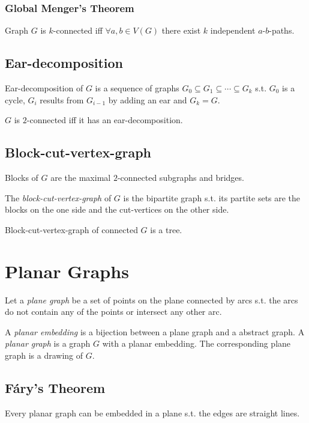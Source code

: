 \subsubsection*{Global Menger's Theorem}

Graph $G$ is $k$-connected iff $\forall a,b \in V(G)$ there exist $k$ independent $a$-$b$-paths.

\subsection*{Ear-decomposition}

Ear-decomposition of $G$ is a sequence of graphs $G_0 \subseteq G_1 \subseteq \cdots \subseteq G_k$ s.t. $G_0$ is a cycle, $G_i$ results from $G_{i-1}$ by adding an ear and $G_k = G$.

\spacing

$G$ is $2$-connected iff it has an ear-decomposition.

\subsection*{Block-cut-vertex-graph}

Blocks of $G$ are the maximal $2$-connected subgraphs and bridges.

The \emph{block-cut-vertex-graph} of $G$ is the bipartite graph s.t. its partite sets are the blocks on the one side and the cut-vertices on the other side.

\spacing

Block-cut-vertex-graph of connected $G$ is a tree.

\section*{Planar Graphs}

Let a \emph{plane graph} be a set of points on the plane connected by arcs s.t. the arcs do not contain any of the points or intersect any other arc.

A \emph{planar embedding} is a bijection between a plane graph and a abstract graph.
A \emph{planar graph} is a graph $G$ with a planar embedding. The corresponding plane graph is a drawing of $G$.

\subsection*{F\'{a}ry's Theorem}

Every planar graph can be embedded in a plane s.t. the edges are straight lines.

